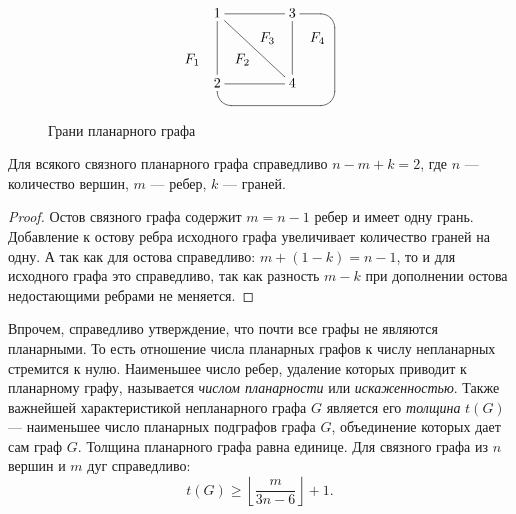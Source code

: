 \begin{figure}
    \[
        {\xymatrix@=7pt{
            *{}
                &1 \ar@{-}[dddrrr] \ar@{-}[rrr] \ar@{-}[ddd]
                    &*{}
                        &*{}
                            &3 \ar@{-}[ddd]
                                &*{}
                                    &*{}
                                        \\
            *{}
                &*{}
                    &*{}
                        &*{F_3}
                            &*{}
                                &*{F_4}
                                    &*{}
                                        \\
            *{F_1}
                &*{}
                    &*{F_2}
                        &*{}
                            &*{}
                                &*{}
                                    &*{}
                                        \\
            *{}
                &2 \ar@{-}[rrr]\ar@{-}`d[rrrrr]`[rrrrr]`^l[uuurrrrr][uuurrr]
                    &*{}
                        &*{}
                            &4
                                &*{}
                                    &*{}
        }}
    \]
    \caption{Грани планарного графа}
    \label{fig:graph:flatsOfPlanar}
\end{figure}

\begin{Theor}[Эйлера]
    Для всякого связного планарного графа справедливо $n-m+k=2$, где $n$ --- количество вершин, $m$ --- ребер, $k$ --- граней.
\end{Theor}
\begin{proof}
    Остов связного графа содержит $m=n-1$ ребер и имеет одну грань. Добавление к остову ребра исходного графа увеличивает количество граней на одну. А так как для остова справедливо: $m+(1-k)=n-1$, то и для исходного графа это справедливо, так как разность $m-k$ при дополнении остова недостающими ребрами не меняется.
\end{proof}

Впрочем, справедливо утверждение, что почти все графы не являются планарными. То есть отношение числа планарных графов к числу непланарных стремится к нулю. Наименьшее число ребер, удаление которых приводит к планарному графу, называется \emph{числом планарности} или \emph{искаженностью}. Также важнейшей характеристикой непланарного графа $G$ является его \emph{толщина} $t(G)$--- наименьшее число планарных подграфов графа $G$, объединение которых дает сам граф $G$. Толщина планарного графа равна единице. Для связного графа из $n$ вершин и $m$ дуг справедливо:
\[
    t(G)\geq\left\lfloor\frac{m}{3n-6}\right\rfloor+1.
\]

